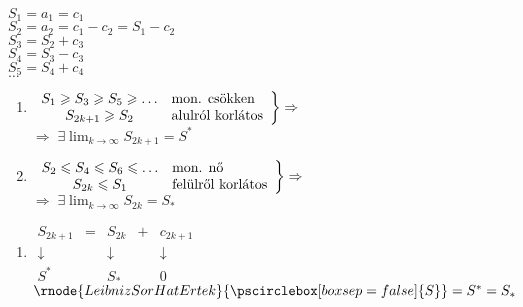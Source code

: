 \documentclass[a4paper,12pt,twoside]{book}
\theoremstyle{break}
\theoremstyle{plain}
\begin{document}
$S_1 = a_1 = c_1$\\
$S_2 = a_2 = c_1-c_2=S_1-c_2$\\
$S_3 = S_2+c_3$\\
$S_4 = S_3-c_3$\\
$S_5 = S_4+c_4$\\
$\ldots$

\begin{enumerate}
\renewcommand{\theenumi}{\pscirclebox[boxsep=false,linewidth=0.3pt]{\arabic{enumi}}}

 \item $\left.\begin{array}{cl}
         S_1 \geqslant S_3 \geqslant S_5 \geqslant \ldots & \hbox{mon. csökken}\\
	 S_{2k+1} \geqslant S_2 & \hbox{alulról korlátos}
        \end{array}\right\} \Rightarrow$\\
       $\displaystyle \Rightarrow \; \exists \lim_{k\to\infty} S_{2k+1}=S^*$

 \item $\left.\begin{array}{cl}
         S_2 \leqslant S_4 \leqslant S_6 \leqslant \ldots & \hbox{mon. nő}\\
	 S_{2k} \leqslant S_1 & \hbox{felülről korlátos}
        \end{array}\right\} \Rightarrow$\\
       $\displaystyle \Rightarrow \; \exists \lim_{k\to\infty} S_{2k}=S_*$

\end{enumerate}

\begin{enumerate}
\renewcommand{\theenumi}{\pscirclebox[boxsep=false,linewidth=0.3pt]{\arabic{enumi}}}
\setcounter{enumi}{2}
  
 \item $\begin{array}{ccccc}
S_{2k+1} &=& S_{2k} & + & c_{2k+1} \\
\downarrow && \downarrow&& \downarrow\\
S^* && S_* && 0
  \end{array}$ \\
 
  $\rnode{LeibnizSorHatErtek}{\pscirclebox[boxsep=false]{S}} = S^* = S_*$\\
  \hspace*{30pt}  

\end{enumerate}
\end{document}
